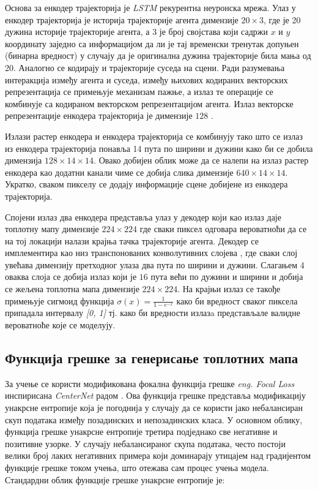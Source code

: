 \documentclass[11pt,oneside]{memoir}
\begin{document}
Основа за енкодер трајекторија је \textit{LSTM} рекурентна неуронска мрежа. Улаз у енкодер трајекторија је
историја трајекторије агента димензије $20\times 3$, 
где је 20 дужина историје трајекторије агента, а 3 је број својстава који садржи $x$ и $y$ координату заједно са информацијом да ли је тај 
временски тренутак допуњен (бинарна вредност) у случају да је оригинална дужина трајекторије била мања од 20. Аналогно се кодирају и
трајекторије суседа на сцени. Ради разумевања интеракција између агента и суседа, између њихових кодираних векторских репрезентација
се примењује механизам пажње, а излаз те операције се комбинује
са кодираном векторском репрезентацијом агента. Излаз векторске репрезентације енкодера трајекторија је димензије $128$
\cite{home}. 

Излази растер енкодера и енкодера трајекторија се комбинују тако што се излаз из енкодера трајекторија понавља 14 пута по
ширини и дужини како би се добила
димензија $128\times 14\times 14$. Овако добијен облик може да се налепи на излаз растер енкодера као додатни канали 
чиме се добија слика димензије $640\times 14\times 14$. Укратко, сваком пикселу се додају информације сцене добијене из енкодера трајекторија.

Спојени излаз два енкодера представља улаз у декодер који као излаз даје топлотну мапу димензије $224\times 224$ где сваки пиксел одговара
вероватноћи да се на тој локацији налази крајња тачка трајекторије агента. Декодер се имплементира као низ транспонованих конволутивних слојева
\cite{guide_to_cnn_arithm}, где сваки слој увећава димензију претходног улаза два пута по ширини и дужини. 
Слагањем 4 оваква слоја се добија излаз који је $16$ пута
већи по дужини и ширини и добија се жељена топлотна мапа димензије $224\times 224$. 
На крајњи излаз се такође примењује сигмоид функција $\sigma(x) = \frac{1}{1-e^{-x}}$ како би вредност сваког
пиксела припадала интервалу \textit{[0, 1]} тј. како би вредности излазa представљале валидне вероватноће које се моделују. 

\subsection{Функција грешке за генерисање топлотних мапа}

За учење се користи модификована фокална функција грешке \textit{eng. Focal Loss} 
инспирисана \textit{CenterNet} радом \cite{centernet, focal_loss}. Ова функција грешке
представља модификацију унакрсне ентропије која је погоднија у случају да се користи јако небалансиран скуп података између позадинских и непозадинских
класа. У основном облику, функција грешке унакрсне ентропије третира подједнако све негативне и позитивне узорке. 
У случају небалансираног скупа података, често постоји велики број лаких негативних примера који доминарају утицајем над градијентом
функције грешке током учења, што отежава сам процес учења модела. Стандардни облик функције грешке унакрсне ентропије је: 
\end{document}
